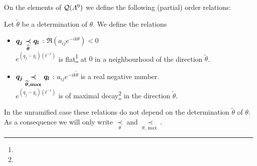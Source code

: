 On the elements of $\cQ(A^0)$ we define the following (partial) order
relations:
\begin{defn}
  Let $\tilde\theta$ be a determination of $\theta$.
  We define the relations
  \begin{itemize}
    \item $\boldmath q_j \underset{\tilde\theta}{\prec} q_l$
      :\Leftrightarrow{} $\Re(a_{ij}e^{-ik\theta})<0$
    \\\Leftrightarrow{} $e^{(q_j-g_l)(t^{-1})}$ is
      flat\footnote{\TODO[define?]} at $0$ in a neighbourhood of the direction
      $\tilde\theta$.
    \item $\boldmath q_j \underset{\tilde\theta,\max}{\prec} q_l$
      :\Leftrightarrow{} $a_{ij}e^{-ik\tilde\theta}$ is a real negative number.
      \\\Leftrightarrow{} $e^{(q_j-g_l)(t^{-1})}$ is of maximal
      decay\footnote{\TODO[define?]} in the
      direction $\tilde\theta$.
      \begin{comment}
        \Leftrightarrow{} $q_{ij}(t^{-1})\in\R_{<0}$ along $\tilde\theta$.
      \end{comment}
  \end{itemize}
\end{defn}
\begin{rem}
  In the unramified case these relations do not depend on the determination
  $\tilde\theta$ of $\theta$. As a consequence we will only write 
  $\underset{\theta}{\prec}$ and $\underset{\theta,\max}{\prec}$.
\end{rem}

